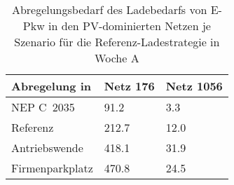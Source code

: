 {
\renewcommand{\arraystretch}{1.2}%
\begin{table}[H]
	\begin{center}
		\caption{Abregelungsbedarf des Ladebedarfs von E-Pkw in den PV-dominierten Netzen je Szenario für die Referenz-Ladestrategie in Woche A}
		\begin{tabu} to 0.6\textwidth {X[1.5] X[1, r] X[1, r]}
			\toprule
			Abregelung in   \si{\mwh}    & Netz \num{176} & Netz \num{1056} \\ \midrule
			NEP C~\num{2035}             & \num{91.2}     & \num{3.3}       \\
			Referenz                     & \num{212.7}    & \num{12.0}      \\
			Antriebswende                & \num{418.1}    & \num{31.9}      \\
			\glqq Firmenparkplatz\grqq{} & \num{470.8}    & \num{24.5}      \\ \bottomrule
		\end{tabu}
		\label{tab:pv_dominated_week_a_epkw_cur}
	\end{center}
	\vspace{-3mm}%
\end{table}
}